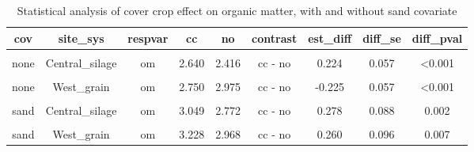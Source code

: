 \documentclass[
]{article}
\begin{document}
\begin{table}[H]

\caption{\label{tab:omstats}Statistical analysis of cover crop effect on organic matter, with and without sand covariate}
\centering
\begin{tabular}[t]{ccccccccc}
\toprule
cov & site\_sys & respvar & cc & no & contrast & est\_diff & diff\_se & diff\_pval\\
\midrule
\cellcolor{gray!6}{none} & \cellcolor{gray!6}{Central\_grain} & \cellcolor{gray!6}{om} & \cellcolor{gray!6}{2.360} & \cellcolor{gray!6}{2.480} & \cellcolor{gray!6}{cc - no} & \cellcolor{gray!6}{-0.120} & \cellcolor{gray!6}{0.051} & \cellcolor{gray!6}{0.02}\\
\cmidrule{1-9}
none & Central\_silage & om & 2.640 & 2.416 & cc - no & 0.224 & 0.057 & <0.001\\
\cmidrule{1-9}
\cellcolor{gray!6}{none} & \cellcolor{gray!6}{East\_grain} & \cellcolor{gray!6}{om} & \cellcolor{gray!6}{3.575} & \cellcolor{gray!6}{3.675} & \cellcolor{gray!6}{cc - no} & \cellcolor{gray!6}{-0.100} & \cellcolor{gray!6}{0.057} & \cellcolor{gray!6}{0.082}\\
\cmidrule{1-9}
none & West\_grain & om & 2.750 & 2.975 & cc - no & -0.225 & 0.057 & <0.001\\
\cmidrule{1-9}
\cellcolor{gray!6}{sand} & \cellcolor{gray!6}{Central\_grain} & \cellcolor{gray!6}{om} & \cellcolor{gray!6}{3.034} & \cellcolor{gray!6}{3.066} & \cellcolor{gray!6}{cc - no} & \cellcolor{gray!6}{-0.032} & \cellcolor{gray!6}{0.082} & \cellcolor{gray!6}{0.696}\\
\cmidrule{1-9}
sand & Central\_silage & om & 3.049 & 2.772 & cc - no & 0.278 & 0.088 & 0.002\\
\cmidrule{1-9}
\cellcolor{gray!6}{sand} & \cellcolor{gray!6}{East\_grain} & \cellcolor{gray!6}{om} & \cellcolor{gray!6}{2.290} & \cellcolor{gray!6}{2.105} & \cellcolor{gray!6}{cc - no} & \cellcolor{gray!6}{0.185} & \cellcolor{gray!6}{0.093} & \cellcolor{gray!6}{0.048}\\
\cmidrule{1-9}
sand & West\_grain & om & 3.228 & 2.968 & cc - no & 0.260 & 0.096 & 0.007\\
\bottomrule
\end{tabular}
\end{table}
\end{document}
